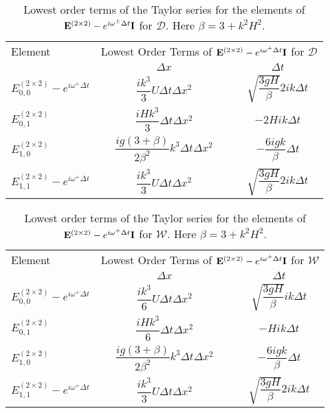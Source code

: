 \begin{table}
	\centering
	\begin{tabular}{l  c c}
		\hline
		Element & \multicolumn{2}{c}{Lowest Order Terms of $\mathbf{E}^{\left(2\times 2\right)} - e^{i \omega^+ \Delta t} \mathbf{I}$ for $\mathcal{D}$} \T \B \\
		\cline{2-3}
		& $\Delta x$&$\Delta t$ \T \B \\
		\hline
		${E}^{\left(2\times 2\right)}_{0,0} -  e^{i \omega^+ \Delta t} $&$\dfrac{ik^3}{3} U \Delta t \Delta x^2$ & $ \sqrt{\dfrac{3gH}{\beta}} 2ik \Delta t $ \T \B  \\
		${E}^{\left(2\times 2\right)}_{0,1}$& $\dfrac{iHk^3}{3} \Delta t \Delta x^2$ & $-2Hi k \Delta t$ \T \B  \\
		${E}^{\left(2\times 2\right)}_{1,0}$& $ \dfrac{ig \left(3 + \beta\right)}{2\beta^2} k^3\Delta t \Delta x^2$ &$ -\dfrac{6igk}{\beta} \Delta t$ \T \B  \\
		${E}^{\left(2\times 2\right)}_{1,1} -  e^{i \omega^+ \Delta t}$& $\dfrac{ik^3}{3} U \Delta t \Delta x^2$ & $ \sqrt{\dfrac{3gH}{\beta}} 2ik \Delta t $ \T \B  \\  \hline
	\end{tabular}
	\caption{Lowest order terms of the Taylor series for the elements of $\mathbf{E}^{\left(2\times 2\right)} - e^{i \omega^\pm \Delta t} \mathbf{I}$ for $\mathcal{D}$. Here $\beta = 3 + k^2 H^2$.}
	\label{tab:EerrD} 
\end{table}
\begin{table}
	\centering
	\begin{tabular}{l  c c}
		\hline
		Element & \multicolumn{2}{c}{Lowest Order Terms of $\mathbf{E}^{\left(2\times 2\right)} - e^{i \omega^+ \Delta t} \mathbf{I}$ for $\mathcal{W}$} \T \B \\
		\cline{2-3} 
		& $\Delta x$&$\Delta t$ \T \B \\
		\hline 
		$E^{\left(2\times 2\right)}_{0,0} -  e^{i \omega^+ \Delta t} $&  $\dfrac{ik^3}{6} U \Delta t \Delta x^2$ & $ \sqrt{\dfrac{3gH}{\beta}} ik \Delta t $ \T \B \\
		$E^{\left(2\times 2\right)}_{0,1}$& $\dfrac{iHk^3}{6} \Delta t \Delta x^2$ &  $-Hi k \Delta t$ \T \B \\
		$E^{\left(2\times 2\right)}_{1,0}$& $ \dfrac{ig \left(3 + \beta\right)}{2\beta^2} k^3\Delta t \Delta x^2$ &  $ -\dfrac{6igk}{\beta} \Delta t$ \T \B  \\
		$E^{\left(2\times 2\right)}_{1,1} -  e^{i \omega^+ \Delta t}$& $\dfrac{ik^3}{3} U \Delta t \Delta x^2$ & $ \sqrt{\dfrac{3gH}{\beta}} 2ik \Delta t $ \T \B  \\  \hline
	\end{tabular}
	\caption{Lowest order terms of the Taylor series for the elements of $\mathbf{E}^{\left(2\times 2\right)} - e^{i \omega^+ \Delta t} \mathbf{I}$ for $\mathcal{W}$. Here $\beta = 3 + k^2 H^2$.}
	\label{tab:EerrW} 
\end{table}

